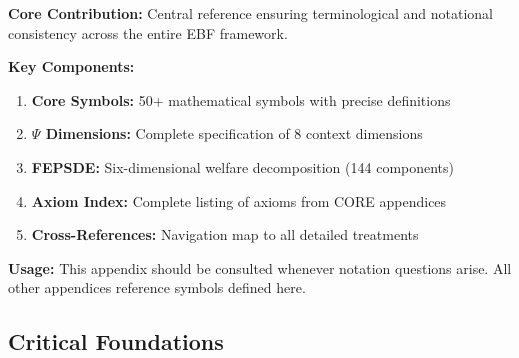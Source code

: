 \begin{tcolorbox}[colback=blue!5!white, colframe=blue!75!black,
    title=\textbf{Appendix GLS Summary: REF-GLOSSARY}]

\textbf{Core Contribution:}
Central reference ensuring terminological and notational consistency across
the entire EBF framework.

\textbf{Key Components:}
\begin{enumerate}[nosep]
    \item \textbf{Core Symbols:} 50+ mathematical symbols with precise definitions
    \item \textbf{$\Psi$ Dimensions:} Complete specification of 8 context dimensions
    \item \textbf{FEPSDE:} Six-dimensional welfare decomposition (144 components)
    \item \textbf{Axiom Index:} Complete listing of axioms from CORE appendices
    \item \textbf{Cross-References:} Navigation map to all detailed treatments
\end{enumerate}

\textbf{Usage:}
This appendix should be consulted whenever notation questions arise.
All other appendices reference symbols defined here.

\end{tcolorbox}


\subsection{Critical Foundations}
\label{sec:glossary-foundations}

